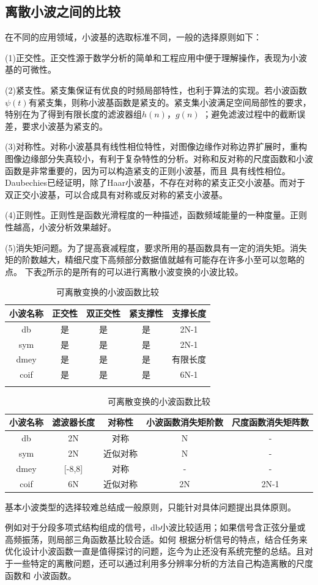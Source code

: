 \subsection{离散小波之间的比较}
在不同的应用领域，小波基的选取标准不同，一般的选择原则如下：
\par (1)正交性。正交性源于数学分析的简单和工程应用中便于理解操作，表现为小波基的可微性。
\par (2)紧支性。紧支集保证有优良的时频局部特性，也利于算法的实现。若小波函数$\psi(t)$有紧支集，则称小波基函数是紧支的。紧支集小波满足空间局部性的要求，特别在为了得到有限长度的滤波器组$h(n)$，$g(n)$
；避免滤波过程中的截断误差，要求小波基为紧支的。
\par (3)对称性。对称小波基具有线性相位特性，对图像边缘作对称边界扩展时，重构图像边缘部分失真较小，有利于复杂特性的分析。对称和反对称的尺度函数和小波函数是非常重要的，因为可以构造紧支的正则小波基，而且
具有线性相位。Daubechies已经证明，除了Haar小波基，不存在对称的紧支正交小波基。而对于双正交小波基，可以合成具有对称或反对称的紧支小波基。
\par (4)正则性。正则性是函数光滑程度的一种描述，函数频域能量的一种度量。正则性越高，小波分析效果越好。
\par (5)消失矩问题。为了提高衰减程度，要求所用的基函数具有一定的消失矩。消失矩的阶数越大，精细尺度下高频部分数据值就越有可能存在许多小至可以忽略的点。
下表\ref{tab:lsxb}所示的是所有的可以进行离散小波变换的小波比较\cite{wxf2003}。
\begin{table}[!h]
	\centering
	\caption{可离散变换的小波函数比较}
	\label{tab:lsxb}
	\begin{tabular}{c|c|c|c|c}
	\toprule[1.5pt]
	小波名称&正交性&双正交性&紧支撑性&支撑长度\\
	\midrule[1pt]
	db&是&是&是&2N-1\\
	sym&是&是&是&2N-1\\
	dmey&是&是&是&有限长度\\
	coif&是&是&是&6N-1\\
	\midrule[1pt]
	\multicolumn{5}{c}{}
	\end{tabular}
	\begin{tabular}{c|c|c|c|c}
	\midrule[1pt]
	小波名称&滤波器长度&对称性&小波函数消失矩阶数&尺度函数消失矩阵数\\
	\midrule[1pt]
	db&2N&对称&N&-\\
	sym&2N&近似对称&N&-\\
	dmey&[-8,8]&对称&-&-\\
	coif&6N&近似对称&2N&2N-1\\
	\bottomrule[1.5pt]
	\end{tabular}
\end{table}
基本小波类型的选择较难总结成一般原则，只能针对具体问题提出具体原则。\par
例如对于分段多项式结构组成的信号，db小波比较适用；如果信号含正弦分量或高频振荡，则局部三角函数基比较合适。如何
根据分析信号的特点，结合任务来优化设计小波函数一直是值得探讨的问题，迄今为止还没有系统完整的总结。且对于一些特定的离散问题，还可以通过利用多分辨率分析的方法自己构造离散的尺度函数和
小波函数。
